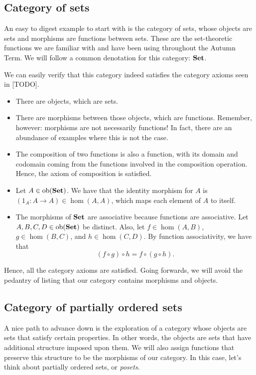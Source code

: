\documentclass[10pt,a4paper,reqno]{amsart}
\numberwithin{figure}{section}
\begin{document}
\subsection{Category of sets}
An easy to digest example to start with is the category of sets, whose objects are sets and
morphisms are functions between sets. These are the set-theoretic functions we
are familiar with and have been using throughout the Autumn Term. We will follow
a common denotation \autocite{Leinster:2014} for this category: $\operatorname{\mathbf{Set}}$.

We can easily verify that this category indeed satisfies the category axioms
seen in [TODO].
\begin{itemize}
        \item There are objects, which are sets.
        \item There are morphisms between those objects, which are functions.
                Remember, however: morphisms are not necessarily functions! In fact,
                there are an abundance of examples where this is not the case.
        \item The composition of two functions is also a function, with its
                domain and codomain coming from the functions involved in the
                composition operation. Hence, the axiom of composition is
                satisfied.
        \item Let $A \in \operatorname{ob} ( \operatorname{\mathbf{Set}} )$. We have that the identity
                morphism for $A$ is $(1_A \colon A \to A) \in \hom (A, A)$, which
                maps each element of $A$ to itself.
        \item The morphisms of $\operatorname{\mathbf{Set}}$ are associative because functions are
                associative. Let $A, B, C, D \in \operatorname{ob} ( \operatorname{\mathbf{Set}} )$ be distinct. Also, let
                $f \in \hom (A, B)$, $g \in \hom (B, C)$, and $h \in
                \hom (C, D)$. By function associativity, we have that
                \[
                        ( f \circ g ) \circ h = f \circ ( g \circ h ).
                \]
\end{itemize}
Hence, all the category axioms are satisfied. Going forwards, we will avoid the
pedantry of listing that our category contains morphisms and objects.

\subsection{Category of partially ordered sets}
A nice path to advance down is the exploration of a category whose objects are
sets that satisfy certain properties. In other words, the objects are sets that have
additional structure imposed upon them. We will also assign functions that
preserve this structure to be the morphisms of our category. In this case,
let's think about partially ordered sets, or \emph{posets}.
\end{document}
